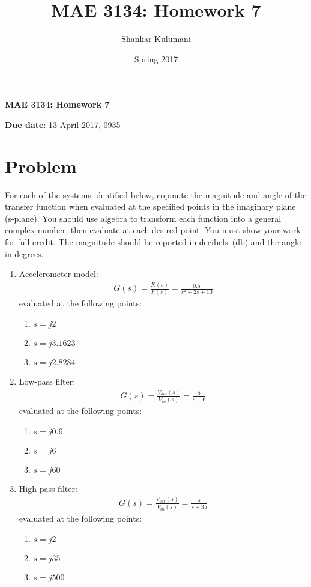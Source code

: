 \documentclass[11pt, reqno]{article}    %
\title{MAE 3134: Homework 7}
\author{Shankar Kulumani}
\date{Spring 2017}                          %
\begin{document}
{\noindent\Large \textbf{MAE 3134: Homework 7}}

\noindent \textbf{Due date}: 13 April 2017, 0935 \\
\section{Problem}
For each of the systems identified below, copmute the magnitude and angle of the transfer function when evaluated at the specified points in the imaginary plane (s-plane).
You should use algebra to transform each function into a general complex number, then evaluate at each desired point. 
You must show your work for full credit.
The magnitude should be reported in decibels~(\si{\decibel}) and the angle in degrees.
\begin{enumerate}
    \item Accelerometer model:
    \begin{align*}
        G(s) = \frac{X(s)}{F(s)} = \frac{0.5}{s^2 + 2 s + 10}
    \end{align*}
    evaluated at the following points:
    \begin{enumerate}
        \item \( s = j 2\) 
        \item \( s = j 3.1623\)
        \item \( s = j 2.8284\)
    \end{enumerate}
    \item Low-pass filter:
    \begin{align*}
        G(s) = \frac{V_{out}(s)}{V_{in}(s)} = \frac{5}{s + 6}
    \end{align*}
    evaluated at the following points:
    \begin{enumerate}
        \item \( s = j 0.6\) 
        \item \( s = j 6\)
        \item \( s = j 60\)
    \end{enumerate}
    \item High-pass filter:
    \begin{align*}
        G(s) = \frac{V_{out}(s)}{V_{in}(s)} = \frac{s}{s + 35}
    \end{align*}
    evaluated at the following points:
    \begin{enumerate}
        \item \( s = j 2\) 
        \item \( s = j 35\)
        \item \( s = j 500\)

\end{enumerate}
\end{enumerate}
\end{document}
